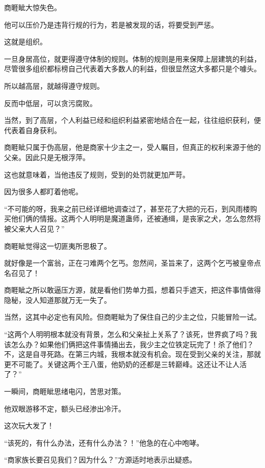 
\begin{this_body}

商睚眦大惊失色。

他可以压价乃是违背行规的行为，若是被发现的话，将要受到严惩。

这就是组织。

一旦身居高位，就更得遵守体制的规则。体制的规则是用来保障上层建筑的利益，尽管很多组织都标榜自己代表着大多数人的利益，但很显然这大多都只是个噱头。

所以越高层，就越得遵守规则。

反而中低层，可以贪污腐败。

当然，到了高层，个人利益已经和组织利益紧密地结合在一起，往往组织获利，便代表着自身获利。

商睚眦只属于伪高层，他是商家十少主之一，受人瞩目，但真正的权利来源于他的父亲。因此只是无根浮萍。

这也就意味着，当他违反了规则，受到的处罚就更加严苛。

因为很多人都盯着他呢。

“不可能的呀，我来之前已经详细地调查过了，甚至花了大把的元石，到风雨楼购买他们俩的情报。这两个人明明是魔道蛊师，还被通缉，是丧家之犬，怎么忽然将被父亲大人召见？”

商睚眦觉得这一切匪夷所思极了。

就好像是一个富翁，正在刁难两个乞丐。忽然间，圣旨来了，这两个乞丐被皇帝点名召见了！

商睚眦之所以敢逼压方源，就是看他们势单力孤，想着只手遮天，把这件事情做得隐秘，没人知道那就万无一失了。

当然，这其中必定也有风险。但商睚眦为了保住自己的少主之位，只能冒险一试。

“这两个人明明根本就没有背景，怎么和父亲扯上关系了？该死，世界疯了吗？我该怎么办？如果他们俩把这件事情捅出去，我少主之位铁定玩完了！杀了他们？不，这是自寻死路。在第三内城，我根本就没有机会。现在受到父亲的关注，那就更不可能了。关键这两个王八蛋，他奶奶的还都是三转巅峰。这还让不让人活了？”

一瞬间，商睚眦思绪电闪，苦思对策。

他双眼游移不定，额头已经渗出冷汗。

这次玩大发了！

“该死的，有什么办法，还有什么办法？！”他急的在心中咆哮。

“商家族长要召见我们？因为什么？”方源适时地表示出疑惑。


\end{this_body}
